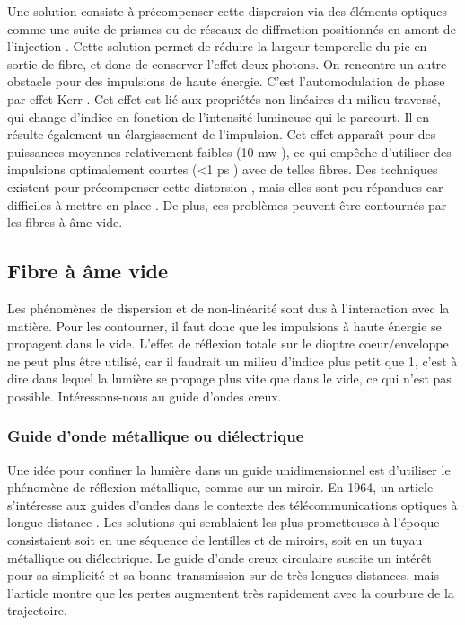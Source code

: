 Une solution consiste à précompenser cette dispersion via des éléments optiques comme une suite de prismes ou de réseaux de diffraction positionnés en amont de l'injection \cite{fork_negative_1984}. Cette solution permet de réduire la largeur temporelle du pic en sortie de fibre, et donc de conserver l'effet deux photons. On rencontre un autre obstacle pour des impulsions de haute énergie. C'est l'automodulation de phase par effet Kerr \cite{agrawal_nonlinear_2000}. Cet effet est lié aux propriétés non linéaires du milieu traversé, qui change d'indice en fonction de l'intensité lumineuse qui le parcourt. Il en résulte également un élargissement de l'impulsion. Cet effet apparaît pour des puissances moyennes relativement faibles (10 mw \cite{helmchen_miniaturization_2013}), ce qui empêche d'utiliser des impulsions optimalement courtes (<1 ps \cite{helmchen_miniaturization_2013}) avec de telles fibres. Des techniques existent pour précompenser cette distorsion \cite{clark_fiber_2001} \cite{lefort_sub-30-fs_2014}, mais elles sont peu répandues car difficiles à mettre en place \cite{helmchen_miniaturization_2013}. De plus, ces problèmes peuvent être contournés par les fibres à âme vide.

\subsection{Fibre à âme vide}

Les phénomènes de dispersion et de non-linéarité sont dus à l'interaction avec la matière. Pour les contourner, il faut donc que les impulsions à haute énergie se propagent dans le vide. L'effet de réflexion totale sur le dioptre coeur/enveloppe ne peut plus être utilisé, car il faudrait un milieu d'indice plus petit que 1, c'est à dire dans lequel la lumière se propage plus vite que dans le vide, ce qui n'est pas possible. Intéressons-nous au guide d'ondes creux.

\subsubsection{Guide d'onde métallique ou diélectrique}

Une idée pour confiner la lumière dans un guide unidimensionnel est d'utiliser le phénomène de réflexion métallique, comme sur un miroir. En 1964, un article s'intéresse aux guides d'ondes dans le contexte des télécommunications optiques à longue distance \cite{marcatili_hollow_1964}. Les solutions qui semblaient les plus prometteuses à l'époque consistaient soit en une séquence de lentilles et de miroirs, soit en un tuyau métallique ou diélectrique. Le guide d'onde creux circulaire suscite un intérêt pour sa simplicité et sa bonne transmission sur de très longues distances, mais l'article montre que les pertes augmentent très rapidement avec la courbure de la trajectoire.

